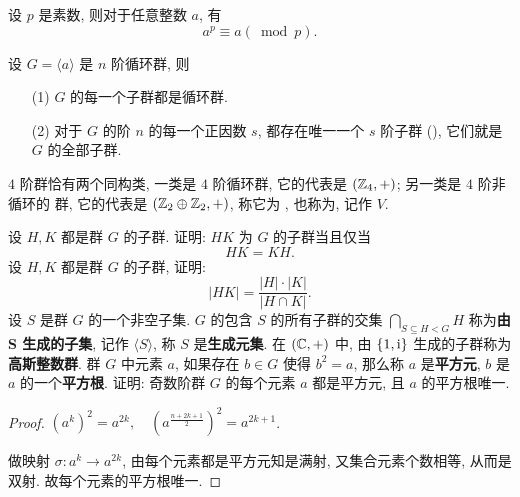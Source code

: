 \begin{theorem}[费马小定理]
	\noindent 设 $p$ 是素数, 则对于任意整数 $a$, 有 $$a^p\equiv a(\bmod p).$$
\end{theorem}

\begin{theorem}
	\noindent 设 $G=\langle a\rangle$ 是 $n$ 阶循环群, 则
	\begin{itemize}
		\item[(1)] $G$ 的每一个子群都是循环群.
		\item[(2)] 对于 $G$ 的阶 $n$ 的每一个正因数 $s$, 都存在唯一一个 $s$ 阶子群 (), 它们就是 $G$ 的全部子群.
	\end{itemize}
\end{theorem}

$4$ 阶群恰有两个同构类, 一类是 $4$ 阶循环群, 它的代表是 $(\mathbb Z_4,+)$; 另一类是 $4$ 阶非循环的 \Abel 群, 它的代表是 $(\mathbb Z_2\oplus\mathbb Z_2,+)$, 称它为 , 也称为, 记作 $V$.

\begin{practice}
	\problem  设 $H,K$ 都是群 $G$ 的子群. 证明: $HK$ 为 $G$ 的子群当且仅当 $$HK=KH.$$
	\problem  设 $H,K$ 都是群 $G$ 的子群, 证明: $$|HK|=\frac{|H|\cdot|K|}{|H\cap K|}.$$
	\problem 设 $S$ 是群 $G$ 的一个非空子集. $G$ 的包含 $S$ 的所有子群的交集 $\bigcap\limits_{S\subseteq H<G} H$ 称为\textbf{由 S 生成的子集}, 记作 $\langle S\rangle$, 称 $S$ 是\textbf{生成元集}.
	\problem 在 $(\mathbb C,+)$ 中, 由 $\{1,\text {i}\}$ 生成的子群称为\textbf{高斯整数群}.
	\problem 群 $G$ 中元素 $a$, 如果存在 $b\in G$ 使得 $b^2=a$, 那么称 $a$ 是\textbf{平方元}, $b$ 是 $a$ 的一个\textbf{平方根}. 证明: 奇数阶群 $G$ 的每个元素 $a$ 都是平方元, 且 $a$ 的平方根唯一.
	\begin{proof}
		$(a^k)^2=a^{2k},\quad (a^{\frac{n+2k+1}{2}})^2=a^{2k+1}$.
		
		做映射 $\sigma: a^k\to a^{2k}$, 由每个元素都是平方元知是满射, 又集合元素个数相等, 从而是双射. 故每个元素的平方根唯一.
	\end{proof} 
\end{practice}